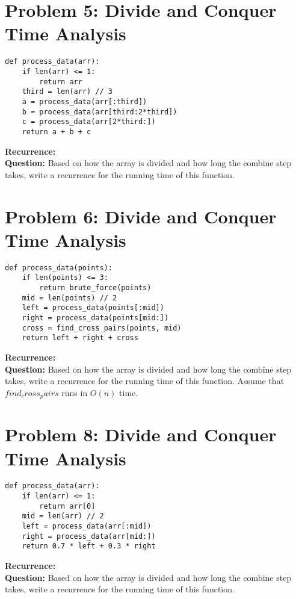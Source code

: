 \documentclass[12pt]{article}
\begin{document}
\vspace{2em}

\section*{Problem 5: Divide and Conquer Time Analysis}
\begin{verbatim}
def process_data(arr):
    if len(arr) <= 1:
        return arr
    third = len(arr) // 3
    a = process_data(arr[:third])
    b = process_data(arr[third:2*third])
    c = process_data(arr[2*third:])
    return a + b + c
\end{verbatim}
\textbf{Recurrence:} \underline{\hspace{10cm}} \\
\textbf{Question:} Based on how the array is divided and how long the combine step takes, write a recurrence for the running time of this function.

\vspace{2em}

\section*{Problem 6: Divide and Conquer Time Analysis}
\begin{verbatim}
def process_data(points):
    if len(points) <= 3:
        return brute_force(points)
    mid = len(points) // 2
    left = process_data(points[:mid])
    right = process_data(points[mid:])
    cross = find_cross_pairs(points, mid)
    return left + right + cross
\end{verbatim}
\textbf{Recurrence:} \underline{\hspace{10cm}} \\
\textbf{Question:} Based on how the array is divided and how long the combine step takes, write a recurrence for the running time of this function. Assume that $find_cross_pairs$ runs in $O(n)$ time.

\vspace{2em}

\section*{Problem 8: Divide and Conquer Time Analysis}
\begin{verbatim}
def process_data(arr):
    if len(arr) <= 1:
        return arr[0]
    mid = len(arr) // 2
    left = process_data(arr[:mid])
    right = process_data(arr[mid:])
    return 0.7 * left + 0.3 * right
\end{verbatim}
\textbf{Recurrence:} \underline{\hspace{10cm}} \\
\textbf{Question:} Based on how the array is divided and how long the combine step takes, write a recurrence for the running time of this function.
\end{document}
